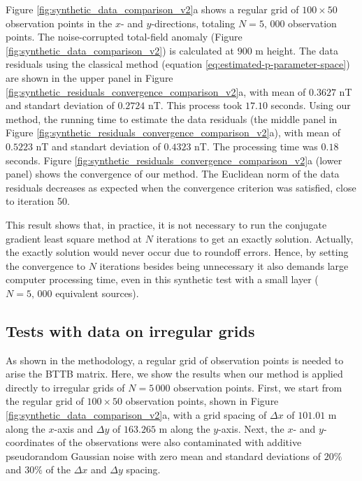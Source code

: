 Figure \ref{fig:synthetic_data_comparison_v2}a shows a regular grid of  $100 \times 50$ observation points in the $x$- and $y$-directions, totaling  $N = 5,\, 000$ observation points. 
The noise-corrupted total-field anomaly (Figure \ref{fig:synthetic_data_comparison_v2}) is calculated at $900$ m height. 
The data residuals using the classical method (equation \ref{eq:estimated-p-parameter-space}) are shown in the upper panel in Figure \ref{fig:synthetic_residuals_convergence_comparison_v2}a, 
with mean of $0.3627$ nT and standart deviation of $0.2724$ nT.
This process took $17.10$ seconds.
Using our method, the running time to estimate the data residuals (the middle panel in Figure \ref{fig:synthetic_residuals_convergence_comparison_v2}a), with mean of $0.5223$ nT and standart deviation of $0.4323$ nT. The processing time was $0.18$ seconds.
Figure \ref{fig:synthetic_residuals_convergence_comparison_v2}a (lower panel) shows the convergence of our method. The Euclidean norm of the data residuals decreases as expected when the
convergence criterion was satisfied, close to iteration 50. 

This result shows that, in practice, it is not necessary to run the conjugate gradient least square method at $N$ iterations to get an exactly solution.
Actually, the exactly solution  would never occur due to roundoff errors.
Hence, by setting the convergence to  $N$ iterations besides being unnecessary it also demands large computer processing time, even in this synthetic test with a small layer 
($N = 5,\, 000$ equivalent sources). 

\subsection*{Tests with data on irregular grids}

As shown in the methodology, a regular grid of observation points is needed to arise the BTTB matrix. 
Here, we show the results when our method is applied directly to irregular grids of $N = 5 \, 000$ observation points. 
First, we start from the  regular grid of $100 \times 50$ observation points, shown in Figure 
\ref{fig:synthetic_data_comparison_v2}a,  with a grid spacing of $\Delta x$ of $101.01$ m along the $x$-axis and $\Delta y$ of $163.265$ m along the $y$-axis. 
Next, the $x$- and $y$-coordinates of the observations were also contaminated with additive pseudorandom Gaussian noise with zero mean and standard deviations of $20\%$ and $30\%$ of the $\Delta x$ and $\Delta y$ spacing.

